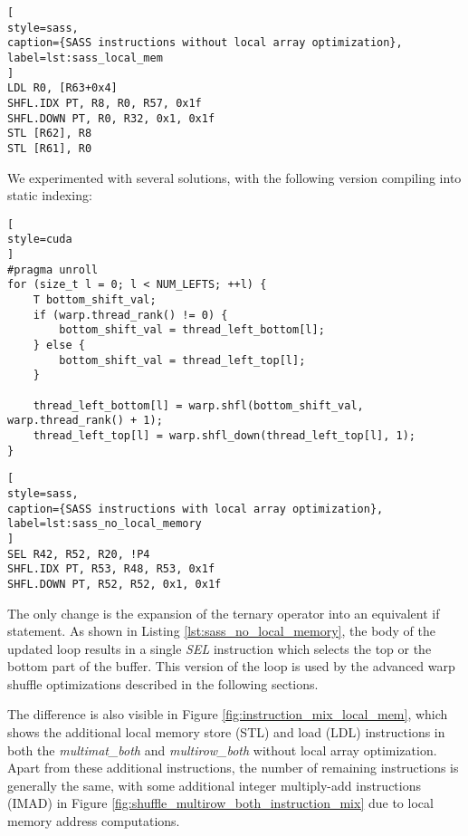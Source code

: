 \begin{lstlisting}[
style=sass,
caption={SASS instructions without local array optimization},
label=lst:sass_local_mem
]
LDL R0, [R63+0x4]
SHFL.IDX PT, R8, R0, R57, 0x1f
SHFL.DOWN PT, R0, R32, 0x1, 0x1f
STL [R62], R8
STL [R61], R0
\end{lstlisting}

We experimented with several solutions, with the following version compiling into static indexing:

\begin{lstlisting}[
style=cuda
]
#pragma unroll
for (size_t l = 0; l < NUM_LEFTS; ++l) {
	T bottom_shift_val;
	if (warp.thread_rank() != 0) {
		bottom_shift_val = thread_left_bottom[l];
	} else {
		bottom_shift_val = thread_left_top[l];
	}

	thread_left_bottom[l] = warp.shfl(bottom_shift_val, warp.thread_rank() + 1);
	thread_left_top[l] = warp.shfl_down(thread_left_top[l], 1);
}
\end{lstlisting}

\begin{lstlisting}[
style=sass,
caption={SASS instructions with local array optimization},
label=lst:sass_no_local_memory
]
SEL R42, R52, R20, !P4
SHFL.IDX PT, R53, R48, R53, 0x1f
SHFL.DOWN PT, R52, R52, 0x1, 0x1f
\end{lstlisting}

The only change is the expansion of the ternary operator into an equivalent if statement. As shown in Listing \ref{lst:sass_no_local_memory}, the body of the updated loop results in a single \textit{SEL} instruction which selects the top or the bottom part of the buffer. This version of the loop is used by the advanced warp shuffle optimizations described in the following sections.

The difference is also visible in Figure \ref{fig:instruction_mix_local_mem}, which shows the additional local memory store (STL) and load (LDL) instructions in both the \textit{multimat\_both} and \textit{multirow\_both} without local array optimization. Apart from these additional instructions, the number of remaining instructions is generally the same, with some additional integer multiply-add instructions (IMAD) in Figure \ref{fig:shuffle_multirow_both_instruction_mix} due to local memory address computations.

